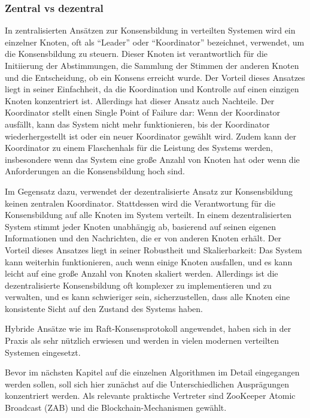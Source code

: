 \subsubsection{Zentral vs dezentral}

In zentralisierten Ansätzen zur Konsensbildung in verteilten Systemen wird ein einzelner Knoten, oft als \enquote{Leader} oder \enquote{Koordinator} bezeichnet, verwendet, um die Konsensbildung zu steuern. Dieser Knoten ist verantwortlich für die Initiierung der Abstimmungen, die Sammlung der Stimmen der anderen Knoten und die Entscheidung, ob ein Konsens erreicht wurde. Der Vorteil dieses Ansatzes liegt in seiner Einfachheit, da die Koordination und Kontrolle auf einen einzigen Knoten konzentriert ist. Allerdings hat dieser Ansatz auch Nachteile. Der Koordinator stellt einen Single Point of Failure dar: Wenn der Koordinator ausfällt, kann das System nicht mehr funktionieren, bis der Koordinator wiederhergestellt ist oder ein neuer Koordinator gewählt wird. Zudem kann der Koordinator zu einem Flaschenhals für die Leistung des Systems werden, insbesondere wenn das System eine große Anzahl von Knoten hat oder wenn die Anforderungen an die Konsensbildung hoch sind.

Im Gegensatz dazu, verwendet der dezentralisierte Ansatz zur Konsensbildung keinen zentralen Koordinator. Stattdessen wird die Verantwortung für die Konsensbildung auf alle Knoten im System verteilt. In einem dezentralisierten System stimmt jeder Knoten unabhängig ab, basierend auf seinen eigenen Informationen und den Nachrichten, die er von anderen Knoten erhält. Der Vorteil dieses Ansatzes liegt in seiner Robustheit und Skalierbarkeit: Das System kann weiterhin funktionieren, auch wenn einige Knoten ausfallen, und es kann leicht auf eine große Anzahl von Knoten skaliert werden. Allerdings ist die dezentralisierte Konsensbildung oft komplexer zu implementieren und zu verwalten, und es kann schwieriger sein, sicherzustellen, dass alle Knoten eine konsistente Sicht auf den Zustand des Systems haben.

Hybride Ansätze wie im Raft-Konsensprotokoll angewendet, haben sich in der Praxis als sehr nützlich erwiesen und werden in vielen modernen verteilten Systemen eingesetzt.

Bevor im nächsten Kapitel auf die einzelnen Algorithmen im Detail eingegangen werden sollen, soll sich hier zunächst auf die Unterschiedlichen Ausprägungen konzentriert werden. Als relevante praktische Vertreter sind ZooKeeper Atomic Broadcast (ZAB) und die Blockchain-Mechanismen gewählt.

